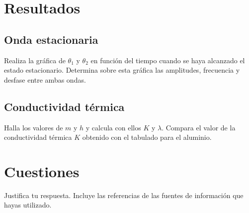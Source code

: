 
\def\numeroPractica{12}                                   %
\def\tituloPractica{Ondas térmicas en una barra metálica} %

\def\fechaPractica{dd/mm/aaaa} %
\def\fechaEntrega{dd/mm/aaaa}  %

\maketitle

\section{Resultados}

\subsection{Onda estacionaria}

Realiza la gráfica de $\theta_1$ y $\theta_2$ en función del tiempo cuando se haya alcanzado el estado estacionario. Determina sobre esta gráfica las amplitudes, frecuencia y desfase entre ambas ondas.

\subsection{Conductividad térmica}

Halla los valores de $m$ y $h$ y calcula con ellos $K$ y $\lambda$. Compara el valor de la conductividad térmica $K$ obtenido con el tabulado para el aluminio.

\section{Cuestiones}


Justifica tu respuesta. Incluye las referencias de las fuentes de información que hayas utilizado.

